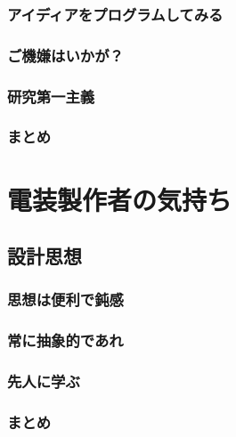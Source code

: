\documentclass[dvipdfmx]{jsbook}
\begin{document}
\section{アイディアをプログラムしてみる}

\section{ご機嫌はいかが？}

\section{研究第一主義}

\section{まとめ}


\clearpage

\part{電装製作者の気持ち}

\chapter{設計思想}

\section{思想は便利で鈍感}

\section{常に抽象的であれ}

\section{先人に学ぶ}

\section{まとめ}
\end{document}
